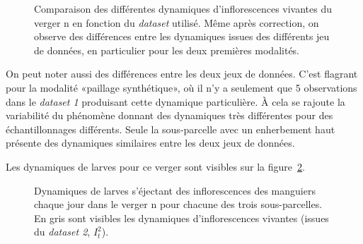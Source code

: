  \begin{figure}[ht]
\centering
{}
\caption{Comparaison des différentes dynamiques d'inflorescences vivantes du verger n en fonction du \emph{dataset} utilisé. Même après correction, on observe des différences entre les dynamiques issues des différents jeu de données, en particulier pour les deux premières modalités.}
\label{fig:inflos2}
\end{figure}
\newpage
 On peut noter aussi des différences entre les deux jeux de données. C'est flagrant pour la modalité «paillage synthétique», où il n'y a seulement que 5 observations dans le \emph{dataset 1} produisant cette dynamique particulière. À cela se rajoute la variabilité du phénomène donnant des dynamiques très différentes pour des échantillonnages différents. Seule la sous-parcelle avec un enherbement haut présente des dynamiques similaires entre les deux jeux de données.
 
 Les dynamiques de larves pour ce verger sont visibles sur la figure~\ref{fig:larves2}.
 
 \begin{figure}[ht]
\centering
{}
\caption{Dynamiques de larves s'éjectant des inflorescences des manguiers chaque jour dans le verger n pour chacune des trois sous-parcelles. En gris sont visibles les dynamiques d'inflorescences vivantes (issues du \emph{dataset 2}, $I^2_t$).}
\label{fig:larves2}
\end{figure}

